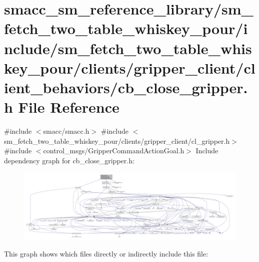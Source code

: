 \hypertarget{sm__fetch__two__table__whiskey__pour_2include_2sm__fetch__two__table__whiskey__pour_2clients_2graad522381b639c48bac27c49691b676b}{}\section{smacc\+\_\+sm\+\_\+reference\+\_\+library/sm\+\_\+fetch\+\_\+two\+\_\+table\+\_\+whiskey\+\_\+pour/include/sm\+\_\+fetch\+\_\+two\+\_\+table\+\_\+whiskey\+\_\+pour/clients/gripper\+\_\+client/client\+\_\+behaviors/cb\+\_\+close\+\_\+gripper.h File Reference}
\label{sm__fetch__two__table__whiskey__pour_2include_2sm__fetch__two__table__whiskey__pour_2clients_2graad522381b639c48bac27c49691b676b}
{\ttfamily \#include $<$smacc/smacc.\+h$>$}\newline
{\ttfamily \#include $<$sm\+\_\+fetch\+\_\+two\+\_\+table\+\_\+whiskey\+\_\+pour/clients/gripper\+\_\+client/cl\+\_\+gripper.\+h$>$}\newline
{\ttfamily \#include $<$control\+\_\+msgs/\+Gripper\+Command\+Action\+Goal.\+h$>$}\newline
Include dependency graph for cb\+\_\+close\+\_\+gripper.\+h\+:
\nopagebreak
\begin{figure}[H]
\begin{center}
\leavevmode
\includegraphics[width=350pt]{sm__fetch__two__table__whiskey__pour_2include_2sm__fetch__two__table__whiskey__pour_2clients_2gr94fd8ec743f258d36e3e91456fdd14d7}
\end{center}
\end{figure}
This graph shows which files directly or indirectly include this file\+:
\nopagebreak
